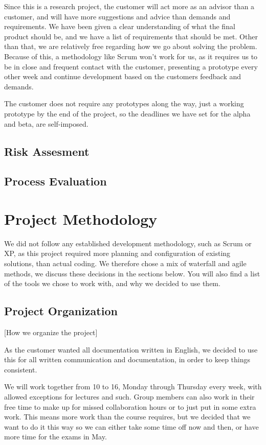\documentclass[12pt]{article}
\begin{document}
    Since this is a research project, the customer will act more as an advisor than a customer, and will have more suggestions and advice than demands and requirements. We have been given a clear understanding of what the final product should be, and we have a list of requirements that should be met. Other than that, we are relatively free regarding how we go about solving the problem. Because of this, a methodology like Scrum won't work for us, as it requires us to be in close and frequent contact with the customer, presenting a prototype every other week and continue development based on the customers feedback and demands.

    The customer does not require any prototypes along the way, just a working prototype by the end of the project, so the deadlines we have set for the alpha and beta, are self-imposed.
    
    \subsection{Risk Assesment}\label{risk}
    
    \subsection{Process Evaluation}\label{processevaluation}
    
\section{Project Methodology}\label{methodology} 
    We did not follow any established development methodology, such as Scrum or XP, as this project required more planning and configuration of existing solutions, than actual coding. We therefore chose a mix of waterfall and agile methods, we discuss these decisions in the sections below. You will also find a list of the tools we chose to work with, and why we decided to use them. 

    \subsection{Project Organization}\label{projectorg}[How we organize the project]

    As the customer wanted all documentation written in English, we decided to use this for all written communication and documentation, in order to keep things consistent.

    We will work together from 10 to 16, Monday through Thursday every week, with allowed exceptions for lectures and such. Group members can also work in their free time to make up for missed collaboration hours or to just put in some extra work. This means more work than the course requires, but we decided that we want to do it this way so we can either take some time off now and then, or have more time for the exams in May.
\end{document}
